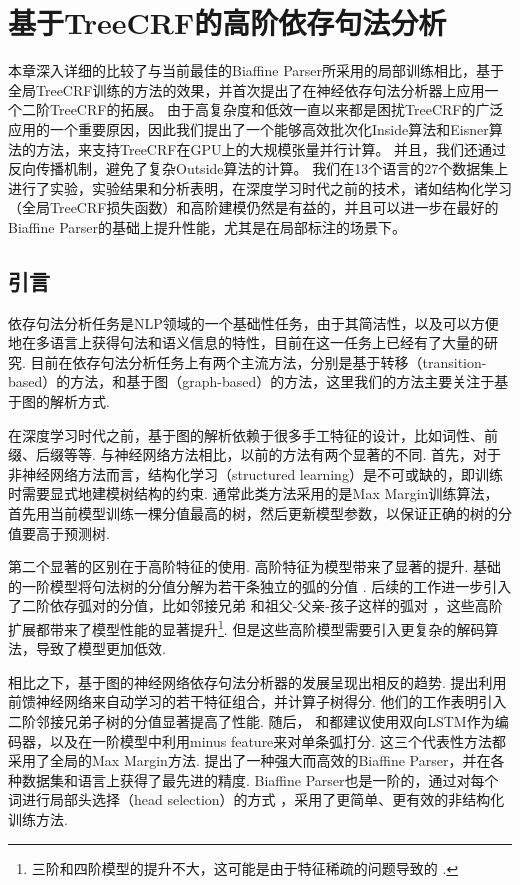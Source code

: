 \chapter{基于TreeCRF的高阶依存句法分析}\label{cha:dep-crf}

本章深入详细的比较了与当前最佳的Biaffine Parser所采用的局部训练相比，基于全局TreeCRF训练的方法的效果，并首次提出了在神经依存句法分析器上应用一个二阶TreeCRF的拓展。
由于高复杂度和低效一直以来都是困扰TreeCRF的广泛应用的一个重要原因，因此我们提出了一个能够高效批次化Inside算法和Eisner算法的方法，来支持TreeCRF在GPU上的大规模张量并行计算。
并且，我们还通过反向传播机制，避免了复杂Outside算法的计算。
我们在13个语言的27个数据集上进行了实验，实验结果和分析表明，在深度学习时代之前的技术，诸如结构化学习（全局TreeCRF损失函数）和高阶建模仍然是有益的，并且可以进一步在最好的Biaffine Parser的基础上提升性能，尤其是在局部标注的场景下。

\section{引言}
依存句法分析任务是NLP领域的一个基础性任务，由于其简洁性，以及可以方便地在多语言上获得句法和语义信息的特性，目前在这一任务上已经有了大量的研究.
目前在依存句法分析任务上有两个主流方法，分别是基于转移（transition-based）的方法，和基于图（graph-based）的方法，这里我们的方法主要关注于基于图的解析方式.

在深度学习时代之前，基于图的解析依赖于很多手工特征的设计，比如词性、前缀、后缀等等.
与神经网络方法相比，以前的方法有两个显著的不同.
首先，对于非神经网络方法而言，结构化学习（structured learning）是不可或缺的，即训练时需要显式地建模树结构的约束.
通常此类方法采用的是Max Margin训练算法，首先用当前模型训练一棵分值最高的树，然后更新模型参数，以保证正确的树的分值要高于预测树.

第二个显著的区别在于高阶特征的使用.
高阶特征为模型带来了显著的提升.
基础的一阶模型将句法树的分值分解为若干条独立的弧的分值 \citep{mcdonald-etal-2005-online}.
后续的工作进一步引入了二阶依存弧对的分值，比如邻接兄弟 \citep{mcdonald-pereira-2006-online}和祖父-父亲-孩子这样的弧对 \citep{carreras-2007-experiments,koo-collins-2010-efficient}，这些高阶扩展都带来了模型性能的显著提升\footnote{三阶和四阶模型的提升不大，这可能是由于特征稀疏的问题导致的 \citep{koo-collins-2010-efficient,ma-zhao-2012-fourth}.}.
但是这些高阶模型需要引入更复杂的解码算法，导致了模型更加低效.

相比之下，基于图的神经网络依存句法分析器的发展呈现出相反的趋势.
\citet{pei-etal-2015-effective}提出利用前馈神经网络来自动学习\citet{chen-manning-2014-fast}的若干特征组合，并计算子树得分.
他们的工作表明引入二阶邻接兄弟子树的分值显著提高了性能.
随后， \citet{wang-chang-2016-graph}和\citet{kiperwasser-goldberg-2016-simple}都建议使用双向LSTM作为编码器，以及在一阶模型中利用minus feature来对单条弧打分.
这三个代表性方法都采用了全局的Max Margin方法.
\citet{dozat-etal-2017-biaffine}提出了一种强大而高效的Biaffine Parser，并在各种数据集和语言上获得了最先进的精度.
Biaffine Parser也是一阶的，通过对每个词进行局部头选择（head selection）的方式 \citep{zhang-etal-2017-head}，采用了更简单、更有效的非结构化训练方法.


